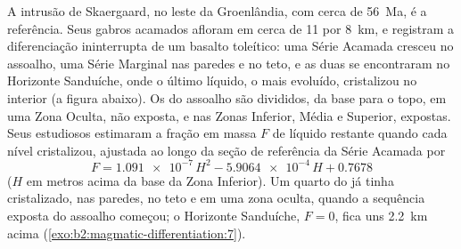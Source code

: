 A intrusão de Skaergaard, no leste da Groenlândia, com cerca de \qty{56}{Ma}, é a
referência. Seus gabros acamados afloram em cerca de 11 por \qty{8}{km}, e registram a
diferenciação ininterrupta de um basalto toleítico: uma Série Acamada cresceu no
assoalho, uma Série Marginal nas paredes e no teto, e as duas se encontraram no Horizonte Sanduíche,
onde o último líquido, o mais evoluído, cristalizou no interior (a figura abaixo).
Os  do assoalho são divididos, da base para o topo, em uma Zona Oculta, não exposta,
e nas Zonas Inferior, Média e Superior, expostas. Seus
estudiosos estimaram a fração em massa $F$ de líquido restante quando cada nível cristalizou, ajustada
ao longo da seção de referência da Série Acamada por
\[
F = \num{1.091e-7}\,H^2 - \num{5.9064e-4}\,H + 0.7678
\]
($H$ em metros acima da base da Zona Inferior). Um quarto do  já tinha
cristalizado, nas paredes, no teto e em uma zona oculta, quando a sequência exposta do
assoalho começou; o Horizonte Sanduíche, $F = 0$, fica uns \qty{2.2}{km} acima
(\cref{exo:b2:magmatic-differentiation:7}).

